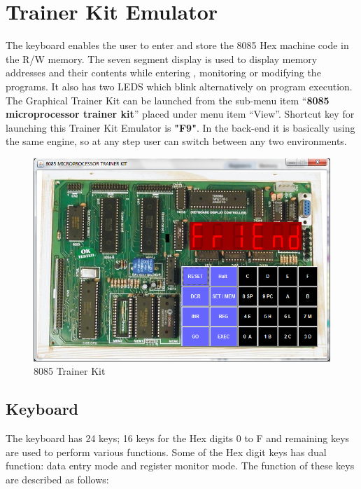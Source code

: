 \chapter{Trainer Kit Emulator}

The keyboard enables the user to enter and store the 8085 Hex machine code in the R/W memory. The seven segment display is used to display memory addresses and their contents while entering , monitoring or modifying the programs. It also has two LEDS which blink alternatively on program execution. The Graphical Trainer Kit can be launched from the sub-menu item ``\textbf{8085 microprocessor trainer kit}'' placed under menu item ``View''. Shortcut key for launching this Trainer Kit Emulator is \textbf{"F9"}. 
In the back-end it is basically using the same engine, so at any step user can switch between any two environments.

\begin{figure}[htbp]
\centering
\includegraphics[width=0.75\linewidth]{"./kit"}
\caption{8085 Trainer Kit}
\end{figure}

\section{Keyboard}
The keyboard has 24 keys; 16 keys for the Hex digits 0 to F and remaining keys are used to perform various functions. Some of the Hex digit keys has dual function: data entry mode and register monitor mode. The function of these keys are described as follows:

